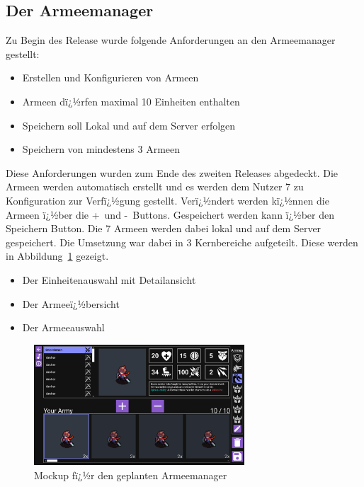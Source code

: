 \documentclass[12pt, titlepage]{scrartcl}
\newcommand{\Abb}[1]{%
	Abbildung\ \ref{#1}%
}
\begin{document}
			\subsection{Der Armeemanager}
			Zu Begin des Release wurde folgende Anforderungen an den Armeemanager gestellt:
			\begin{itemize}
				\item Erstellen und Konfigurieren von Armeen
				\item Armeen dï¿½rfen maximal 10 Einheiten enthalten
				\item Speichern soll Lokal und auf dem Server erfolgen
				\item Speichern von mindestens 3 Armeen
			\end{itemize}
			Diese Anforderungen wurden zum Ende des zweiten Releases abgedeckt. Die Armeen werden automatisch erstellt und es werden dem Nutzer 7 zu Konfiguration zur Verfï¿½gung gestellt. Verï¿½ndert werden kï¿½nnen die Armeen ï¿½ber die \glqq +\grqq \ und \glqq -\grqq \ Buttons. Gespeichert werden kann ï¿½ber den Speichern Button. Die 7 Armeen werden dabei lokal und auf dem Server gespeichert. Die Umsetzung war dabei in 3 Kernbereiche aufgeteilt. Diese werden in \Abb{MockUpArmeemanager} gezeigt.
			\begin{itemize}
				\item Der Einheitenauswahl mit Detailansicht
				\item Der Armeeï¿½bersicht
				\item Der Armeeauswahl
			\end{itemize} 
		
			\begin{figure}[H] 
				\centering
				\includegraphics[width=0.7\textwidth]{ArmyBuilderMockUp.png}
				\caption{Mockup fï¿½r den geplanten Armeemanager}
				\label{MockUpArmeemanager}
			\end{figure}
			
\end{document}
